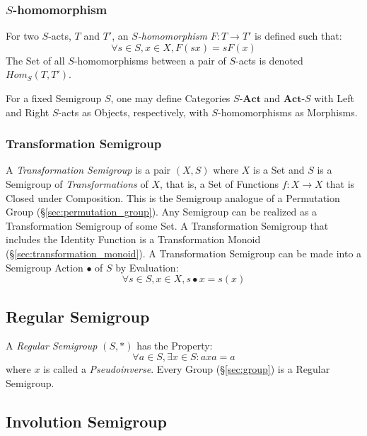 \subsubsection{$S$-homomorphism}\label{sec:s_homomorphism}

For two $S$-acts, $T$ and $T'$, an \emph{$S$-homomorphism} $F : T
\rightarrow T'$ is defined such that:
\[
  \forall s \in S, x \in X, F(sx) = sF(x)
\]
The Set of all $S$-homomorphisms between a pair of $S$-acts is denoted
$Hom_S(T,T')$.

For a fixed Semigroup $S$, one may define Categories
$S\text{-}\mathbf{Act}$ and $\mathbf{Act}\text{-}S$ with Left and
Right $S$-acts as Objects, respectively, with $S$-homomorphisms as
Morphisms.



\subsubsection{Transformation Semigroup}\label{sec:transformation_semigroup}

A \emph{Transformation Semigroup} is a pair $(X,S)$ where $X$ is a Set
and $S$ is a Semigroup of \emph{Transformations} of $X$, that is, a
Set of Functions $f : X \rightarrow X$ that is Closed under
Composition. This is the Semigroup analogue of a Permutation Group
(\S\ref{sec:permutation_group}). Any Semigroup can be realized as a
Transformation Semigroup of some Set. A Transformation Semigroup that
includes the Identity Function is a Transformation Monoid
(\S\ref{sec:transformation_monoid}). A Transformation Semigroup can be
made into a Semigroup Action $\bullet$ of $S$ by Evaluation:
\[
  \forall s \in S, x \in X, s \bullet x = s(x)
\]



\subsection{Regular Semigroup}\label{sec:regular_semigroup}

A \emph{Regular Semigroup} $(S,*)$ has the Property:
\[
  \forall a \in S, \exists x \in S : axa = a
\]
where $x$ is called a \emph{Pseudoinverse}. Every Group
(\S\ref{sec:group}) is a Regular Semigroup.



\subsection{Involution Semigroup}\label{sec:involution_semigroup}

